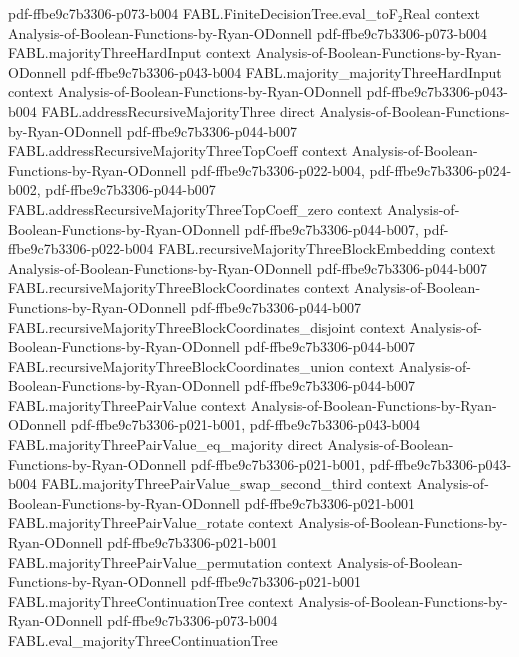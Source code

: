 \begin{theorem}
{    pdf-ffbe9c7b3306-p073-b004}
\proofstep
  {FABL.FiniteDecisionTree.eval_toF₂Real}
  {context}
  {Analysis-of-Boolean-Functions-by-Ryan-ODonnell}
  {pdf-ffbe9c7b3306-p073-b004}
\proofstep
  {FABL.majorityThreeHardInput}
  {context}
  {Analysis-of-Boolean-Functions-by-Ryan-ODonnell}
  {pdf-ffbe9c7b3306-p043-b004}
\proofstep
  {FABL.majority_majorityThreeHardInput}
  {context}
  {Analysis-of-Boolean-Functions-by-Ryan-ODonnell}
  {pdf-ffbe9c7b3306-p043-b004}
\proofstep
  {FABL.addressRecursiveMajorityThree}
  {direct}
  {Analysis-of-Boolean-Functions-by-Ryan-ODonnell}
  {pdf-ffbe9c7b3306-p044-b007}
\proofstep
  {FABL.addressRecursiveMajorityThreeTopCoeff}
  {context}
  {Analysis-of-Boolean-Functions-by-Ryan-ODonnell}
  {pdf-ffbe9c7b3306-p022-b004,
    pdf-ffbe9c7b3306-p024-b002,
    pdf-ffbe9c7b3306-p044-b007}
\proofstep
  {FABL.addressRecursiveMajorityThreeTopCoeff_zero}
  {context}
  {Analysis-of-Boolean-Functions-by-Ryan-ODonnell}
  {pdf-ffbe9c7b3306-p044-b007,
    pdf-ffbe9c7b3306-p022-b004}
\proofstep
  {FABL.recursiveMajorityThreeBlockEmbedding}
  {context}
  {Analysis-of-Boolean-Functions-by-Ryan-ODonnell}
  {pdf-ffbe9c7b3306-p044-b007}
\proofstep
  {FABL.recursiveMajorityThreeBlockCoordinates}
  {context}
  {Analysis-of-Boolean-Functions-by-Ryan-ODonnell}
  {pdf-ffbe9c7b3306-p044-b007}
\proofstep
  {FABL.recursiveMajorityThreeBlockCoordinates_disjoint}
  {context}
  {Analysis-of-Boolean-Functions-by-Ryan-ODonnell}
  {pdf-ffbe9c7b3306-p044-b007}
\proofstep
  {FABL.recursiveMajorityThreeBlockCoordinates_union}
  {context}
  {Analysis-of-Boolean-Functions-by-Ryan-ODonnell}
  {pdf-ffbe9c7b3306-p044-b007}
\proofstep
  {FABL.majorityThreePairValue}
  {context}
  {Analysis-of-Boolean-Functions-by-Ryan-ODonnell}
  {pdf-ffbe9c7b3306-p021-b001,
    pdf-ffbe9c7b3306-p043-b004}
\proofstep
  {FABL.majorityThreePairValue_eq_majority}
  {direct}
  {Analysis-of-Boolean-Functions-by-Ryan-ODonnell}
  {pdf-ffbe9c7b3306-p021-b001,
    pdf-ffbe9c7b3306-p043-b004}
\proofstep
  {FABL.majorityThreePairValue_swap_second_third}
  {context}
  {Analysis-of-Boolean-Functions-by-Ryan-ODonnell}
  {pdf-ffbe9c7b3306-p021-b001}
\proofstep
  {FABL.majorityThreePairValue_rotate}
  {context}
  {Analysis-of-Boolean-Functions-by-Ryan-ODonnell}
  {pdf-ffbe9c7b3306-p021-b001}
\proofstep
  {FABL.majorityThreePairValue_permutation}
  {context}
  {Analysis-of-Boolean-Functions-by-Ryan-ODonnell}
  {pdf-ffbe9c7b3306-p021-b001}
\proofstep
  {FABL.majorityThreeContinuationTree}
  {context}
  {Analysis-of-Boolean-Functions-by-Ryan-ODonnell}
  {pdf-ffbe9c7b3306-p073-b004}
\proofstep
  {FABL.eval_majorityThreeContinuationTree}

\end{theorem}
